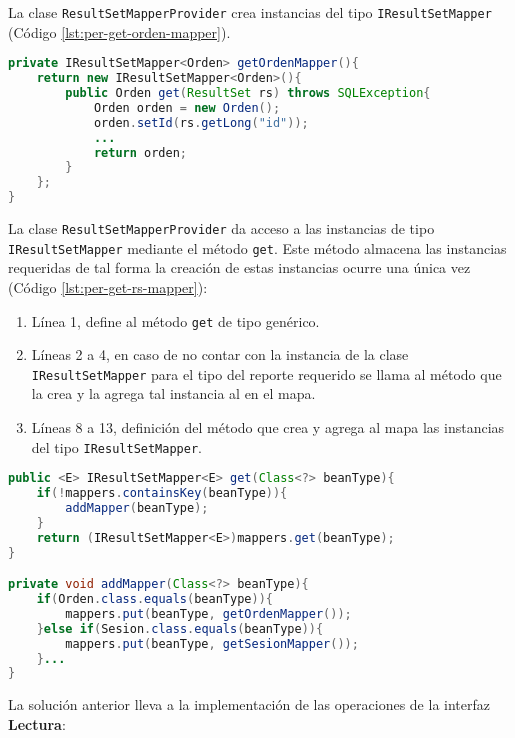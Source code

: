 La clase \texttt{ResultSetMapperProvider} crea instancias del tipo \texttt{IResultSetMapper} (Código \ref{lst:per-get-orden-mapper}).
\begin{lstlisting}[language=Java, caption={Creación de un objeto del tipo IResultSetMapper.}, captionpos=b, label={lst:per-get-orden-mapper}]
private IResultSetMapper<Orden> getOrdenMapper(){
	return new IResultSetMapper<Orden>(){
		public Orden get(ResultSet rs) throws SQLException{
			Orden orden = new Orden();
			orden.setId(rs.getLong("id"));
			...
			return orden;
		}
	};
}
\end{lstlisting}
La clase \texttt{ResultSetMapperProvider} da acceso a las instancias de tipo \texttt{IResultSetMapper} mediante el método \texttt{get}. Este método almacena las instancias requeridas de tal forma la creación de estas instancias ocurre una única vez (Código \ref{lst:per-get-rs-mapper}):
\begin{enumerate}
	\item Línea 1, define al método \texttt{get} de tipo genérico.
	\item Líneas 2 a 4, en caso de no contar con la instancia de la clase \texttt{IResultSetMapper} para el tipo del reporte requerido se llama al método que la crea y la agrega tal instancia al en el mapa.
	\item Líneas 8 a 13, definición del método que crea y agrega al mapa las instancias del tipo \texttt{IResultSetMapper}.
\end{enumerate}
\begin{lstlisting}[language=Java, caption={Selección de instancias de IResultSetMapper.}, captionpos=b, label={lst:per-get-rs-mapper}]
public <E> IResultSetMapper<E> get(Class<?> beanType){
	if(!mappers.containsKey(beanType)){
		addMapper(beanType);
	}
	return (IResultSetMapper<E>)mappers.get(beanType);
}

private void addMapper(Class<?> beanType){
	if(Orden.class.equals(beanType)){
		mappers.put(beanType, getOrdenMapper());
	}else if(Sesion.class.equals(beanType)){
		mappers.put(beanType, getSesionMapper());
	}...
}
\end{lstlisting}
La solución anterior lleva a la implementación de las operaciones de la interfaz \textbf{Lectura}:
